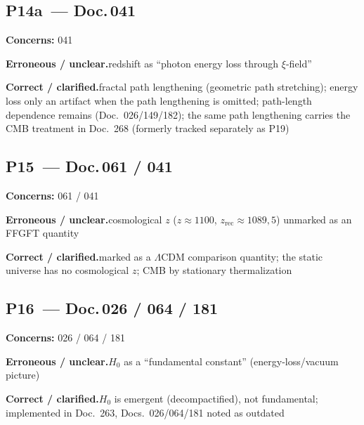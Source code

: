\medskip


\subsection*{P14a~--- Doc.\,041}

\noindent\textbf{Concerns:} 041


\smallskip\noindent\textbf{Erroneous / unclear.}\quad redshift as \enquote{photon energy loss through $\xi$-field}


\smallskip\noindent\textbf{Correct / clarified.}\quad fractal path lengthening (geometric path stretching); energy loss only an artifact when the path lengthening is omitted; path-length dependence remains (Doc.~026/149/182); the same path lengthening carries the CMB treatment in Doc.~268 (formerly tracked separately as P19)


\medskip


\subsection*{P15~--- Doc.\,061 / 041}

\noindent\textbf{Concerns:} 061 / 041


\smallskip\noindent\textbf{Erroneous / unclear.}\quad cosmological $z$ ($z\approx 1100$, $z_{\text{rec}}\approx 1089{,}5$) unmarked as an FFGFT quantity


\smallskip\noindent\textbf{Correct / clarified.}\quad marked as a $\Lambda$CDM comparison quantity; the static universe has no cosmological $z$; CMB by stationary thermalization


\medskip


\subsection*{P16~--- Doc.\,026 / 064 / 181}

\noindent\textbf{Concerns:} 026 / 064 / 181


\smallskip\noindent\textbf{Erroneous / unclear.}\quad $H_0$ as a \enquote{fundamental constant} (energy-loss/vacuum picture)


\smallskip\noindent\textbf{Correct / clarified.}\quad $H_0$ is emergent (decompactified), not fundamental; implemented in Doc.~263, Docs.~026/064/181 noted as outdated


